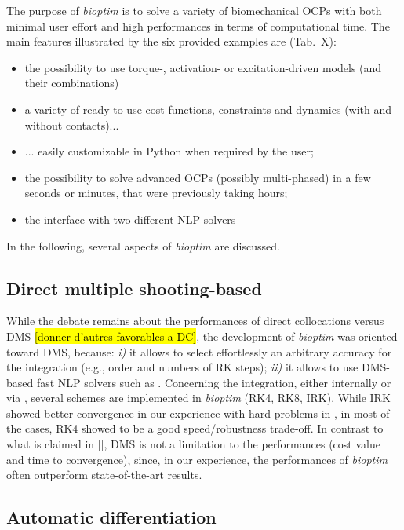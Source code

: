 The purpose of \textit{bioptim} is to solve a variety of biomechanical OCPs with both minimal user effort and high performances in terms of computational time. 
The main features illustrated by the six provided examples are (Tab.~X): 
\begin{itemize}
\item the possibility to use torque-, activation- or excitation-driven models (and their combinations)
\item a variety of ready-to-use cost functions, constraints and dynamics (with and without contacts)...
\item ... easily customizable in Python when required by the user;
\item the possibility to solve advanced OCPs (possibly multi-phased) in a few seconds or minutes, that were previously taking hours;
\item the interface with two different NLP solvers
\end{itemize}
In the following, several aspects of \textit{bioptim} are discussed.


\subsection{Direct multiple shooting-based}

While the debate remains about the performances of direct collocations versus DMS \cite{diehl2006fast}\hl{[donner d'autres favorables a DC]}, the development of \textit{bioptim} was oriented toward DMS, because: \textit{i)} it allows to select effortlessly an arbitrary accuracy for the integration (e.g., order and numbers of RK steps); \textit{ii)} it allows to use DMS-based fast NLP solvers such as \acados.
Concerning the integration, either internally or via \acados, several schemes are implemented in \textit{bioptim} (RK4, RK8, IRK).
While IRK showed better convergence in our experience with hard problems in \acados, in most of the cases, RK4 showed to be a good speed/robustness trade-off. 
In contrast to what is claimed in [\addref], DMS is not a limitation to the performances (cost value and time to convergence), since, in our experience, the performances of \textit{bioptim} often outperform state-of-the-art results.

\subsection{Automatic differentiation}

